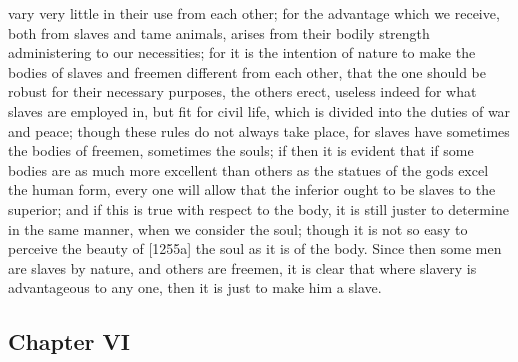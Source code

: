 \documentclass[12pt]{article}
\begin{document}
vary very little in their use from each other; for the advantage which we receive, both from slaves and tame animals, arises from their bodily strength administering to our necessities; for it is the intention of nature to make the bodies of slaves and freemen different from each other, that the one should be robust for their necessary purposes, the others erect, useless indeed for what slaves are employed in, but fit for civil life, which is divided into the duties of war and peace; though these rules do not always take place, for slaves have sometimes the bodies of freemen, sometimes the souls; if then it is evident that if some bodies are as much more excellent than others as the statues of the gods excel the human form, every one will allow that the inferior ought to be slaves to the superior; and if this is true with respect to the body, it is still juster to determine in the same manner, when we consider the soul; though it is not so easy to perceive the beauty of [1255a] the soul as it is of the body. Since then some men are slaves by nature, and others are freemen, it is clear that where slavery is advantageous to any one, then it is just to make him a slave.

\subsection*{Chapter VI}
\end{document}
